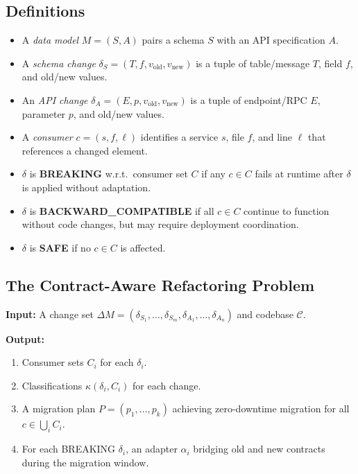 \documentclass[10pt,twocolumn]{article}
\begin{document}
\subsection{Definitions}

\begin{itemize}[leftmargin=*,itemsep=1pt,topsep=2pt]
  \item A \emph{data model} $M = (S, A)$ pairs a schema $S$ with an API
  specification $A$.

  \item A \emph{schema change} $\delta_S = (T, f, v_\text{old}, v_\text{new})$
  is a tuple of table/message $T$, field $f$, and old/new values.

  \item An \emph{API change} $\delta_A = (E, p, v_\text{old}, v_\text{new})$
  is a tuple of endpoint/RPC $E$, parameter $p$, and old/new values.

  \item A \emph{consumer} $c = (s, f, \ell)$ identifies a service $s$, file
  $f$, and line $\ell$ that references a changed element.

  \item $\delta$ is \textbf{BREAKING} w.r.t.\ consumer set $C$ if any $c \in C$
  fails at runtime after $\delta$ is applied without adaptation.

  \item $\delta$ is \textbf{BACKWARD\_COMPATIBLE} if all $c \in C$ continue
  to function without code changes, but may require deployment coordination.

  \item $\delta$ is \textbf{SAFE} if no $c \in C$ is affected.
\end{itemize}

\subsection{The Contract-Aware Refactoring Problem}

\noindent\textbf{Input:} A change set $\Delta M = (\delta_{S_1}, \ldots,
\delta_{S_m}, \delta_{A_1}, \ldots, \delta_{A_n})$ and codebase $\mathcal{C}$.

\noindent\textbf{Output:}
\begin{enumerate}[leftmargin=*,itemsep=1pt,topsep=2pt]
  \item Consumer sets $C_i$ for each $\delta_i$.
  \item Classifications $\kappa(\delta_i, C_i)$ for each change.
  \item A migration plan $P = (p_1, \ldots, p_k)$ achieving zero-downtime
  migration for all $c \in \bigcup_i C_i$.
  \item For each BREAKING $\delta_i$, an adapter $\alpha_i$ bridging old
  and new contracts during the migration window.
\end{enumerate}
\end{document}
